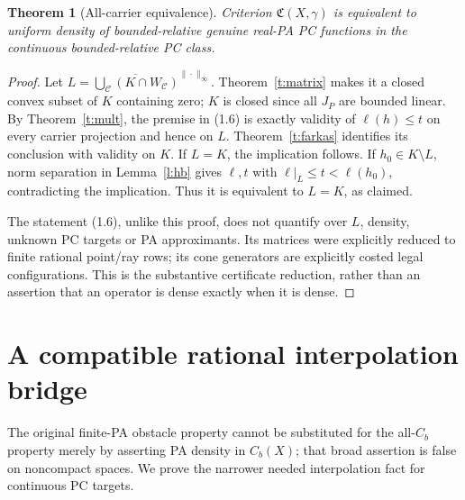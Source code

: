 \documentclass[11pt]{article}
\newtheorem{theorem}{Theorem}[section]
\begin{document}
\begin{theorem}[All-carrier equivalence]\label{t:dual}
Criterion $\mathfrak C(X,\gamma)$ is equivalent to uniform density of bounded-relative genuine real-PA PC functions in the \emph{continuous} bounded-relative PC class.
\end{theorem}
\begin{proof}
Let $L=\overline{\bigcup_\mathcal C(K\cap W_\mathcal C)}^{\|\cdot\|_\infty}$. Theorem~\ref{t:matrix} makes it a closed convex subset of $K$ containing zero; $K$ is closed since all $J_P$ are bounded linear. By Theorem~\ref{t:mult}, the premise in (1.6) is exactly validity of $\ell(h)\leq t$ on every carrier projection and hence on $L$. Theorem~\ref{t:farkas} identifies its conclusion with validity on $K$. If $L=K$, the implication follows. If $h_0\in K\setminus L$, norm separation in Lemma~\ref{l:hb} gives $\ell,t$ with $\ell|_L\leq t<\ell(h_0)$, contradicting the implication. Thus it is equivalent to $L=K$, as claimed.

The statement (1.6), unlike this proof, does not quantify over $L$, density, unknown PC targets or PA approximants. Its matrices were explicitly reduced to finite rational point/ray rows; its cone generators are explicitly costed legal configurations. This is the substantive certificate reduction, rather than an assertion that an operator is dense exactly when it is dense.
\end{proof}

\section{A compatible rational interpolation bridge}\label{s:bridge}
The original finite-PA obstacle property cannot be substituted for the all-$C_b$ property merely by asserting PA density in $C_b(X)$; that broad assertion is false on noncompact spaces. We prove the narrower needed interpolation fact for continuous PC targets.
\end{document}
